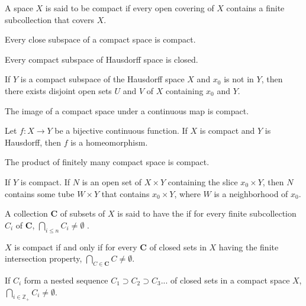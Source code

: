 \begin{definition}
    A space $X$ is said to be compact if every open covering of $X$ contains a finite subcollection that covers $X$.
\end{definition}

\begin{theorem}
    Every close subspace of a compact space is compact.    
\end{theorem}

\begin{theorem}
    Every compact subspace of Hausdorff space is closed.    
\end{theorem}

\begin{theorem}
    If $Y$ is a compact subspace of the Hausdorff space $X$ and $x_0$ is not in $Y$, then there exists disjoint open sets $U$ and $V$ of $X$ containing $x_0$ and $Y$.    
\end{theorem}

\begin{theorem}
    The image of a compact space under a continuous map is compact.    
\end{theorem}

\begin{theorem}
    Let $f: X \rightarrow Y$ be a bijective continuous function. If $X$ is compact and $Y$ is Hausdorff, then $f$ is a homeomorphism.    
\end{theorem}

\begin{theorem}
    The product of finitely many compact space is compact.    
\end{theorem}

\begin{theorem}
    If $Y$ is compact. If $N$ is an open set of $X \times Y$ containing the slice $x_0 \times Y$, then $N$ contains some tube $W \times Y$ that contains $x_0 \times Y$, where $W$ is a neighborhood of $x_0$.
\end{theorem}

\begin{definition}
    A collection $\mathbf{C}$ of subsets of $X$ is said to have the  if for every finite subcollection $C_i$ of $\mathbf{C}$, $\bigcap_{i \leq n} C_i \neq \emptyset$ .
\end{definition}

\begin{theorem}
    $X$ is compact if and only if for every $\mathbf{C}$ of closed sets in $X$ having the finite intersection property, $\bigcap_{C \in \mathbf{C}} C \neq \emptyset$.
    
    If $C_i$ form a nested sequence $C_1 \supset C_2 \supset C_3 ...$ of closed sets in a compact space $X$, $\bigcap_{i \in \mathbb{Z}_{+}} C_i \neq \emptyset$.
\end{theorem}


